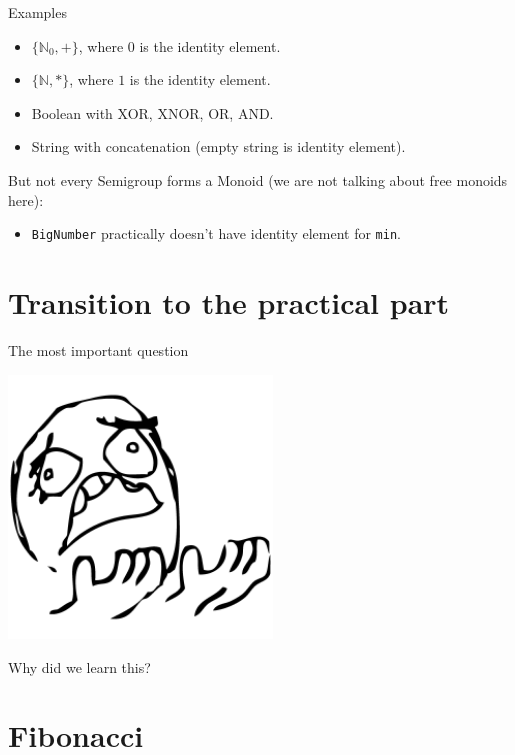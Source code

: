 \documentclass[presentation,aspectratio=169,smaller]{beamer}
\begin{document}
\begin{frame}[label={sec:orgf106318},fragile]{Examples}
 \begin{itemize}
\item \(\{\mathbb{N}_0, +\}\), where \(0\) is the identity element.
\item \(\{\mathbb{N}, *\}\), where \(1\) is the identity element.
\item Boolean with XOR, XNOR, OR, AND.
\item String with concatenation (empty string is identity element).
\end{itemize}

But not every Semigroup forms a Monoid (we are not talking about free monoids
here):

\begin{itemize}
\item \texttt{BigNumber} practically doesn’t have identity element for \texttt{min}.
\end{itemize}
\end{frame}

\section*{Transition to the practical part}
\label{sec:org4f64b98}

\begin{frame}[label={sec:org8ad43a7}]{The most important question}
\begin{center}
\includegraphics[height=7cm]{images/whyyy.png}
\end{center}

Why did we learn this?
\end{frame}

\section*{Fibonacci}
\label{sec:org7296e3b}
\end{document}
